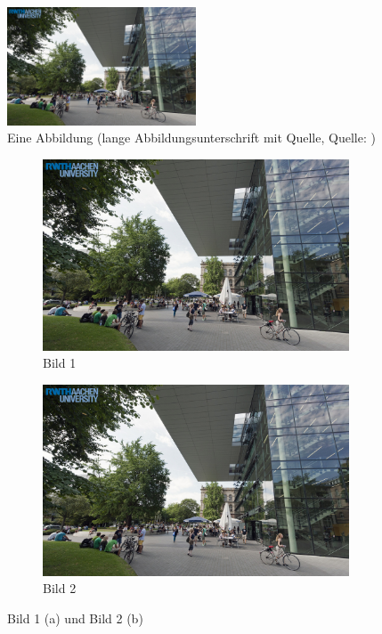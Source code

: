 \begin{figure}[htbp]
	\centering
		\includegraphics[width = 0.5\textwidth]{Contents/Resources/superc.jpeg}
	\caption[Eine Abbildung (kurze Abbildungsunterschrift ohne Quelle)]{Eine Abbildung (lange Abbildungsunterschrift mit Quelle, Quelle: \cite[1]{Mustermann.2012})}
	\label{fig:eine_abbildung}
\end{figure}

\begin{figure}[htbp]
	\centering
	\begin{subfigure}[t]{0.46\textwidth}
		\includegraphics[width = 1\textwidth]{Contents/Resources/superc.jpeg}
		\caption{Bild 1}
		\label{fig:bild1}
	\end{subfigure}
	\begin{subfigure}[t]{0.46\textwidth}
		\includegraphics[width = 1\textwidth]{Contents/Resources/superc.jpeg}
		\caption{Bild 2}
		\label{fig:bild2}
	\end{subfigure}
	\caption[Zwei Abbildungen]{Bild 1 (a) und Bild 2 (b)}
	\label{fig:mehrere_abbildungen}
\end{figure}

